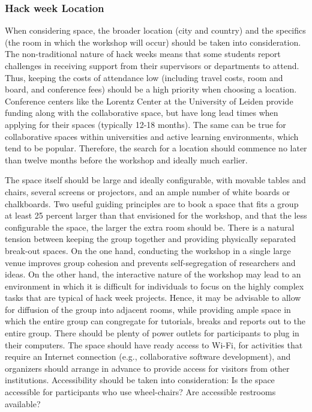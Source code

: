 \documentclass{aastex62}
\begin{document}
\subsubsection{Hack week Location}
When considering space, the broader location (city and country) and the specifics (the room in which the workshop will occur) should be taken into consideration. The non-traditional nature of hack weeks means that some students report challenges in receiving support from their supervisors or departments to attend. Thus, keeping the costs of attendance low (including travel costs, room and board, and conference fees) should be a high priority when choosing a location. Conference centers like the Lorentz Center at the University of Leiden provide funding along with the collaborative space, but have long lead times when applying for their spaces (typically 12-18 months). The same can be true for collaborative spaces within universities and active learning environments, which tend to be popular. Therefore, the search for a location should commence no later than twelve months before the workshop and ideally much earlier.

The space itself should be large and ideally configurable, with movable tables and chairs, several screens or projectors, and an ample number of white boards or chalkboards. Two useful guiding principles are to book a space that fits a group at least 25 percent larger than that envisioned for the workshop, and that the less configurable the space, the larger the extra room should be.
There is a natural tension between keeping the group together and providing physically separated break-out spaces. On the one hand, conducting the workshop in a single large venue improves group cohesion and prevents self-segregation of researchers and ideas. On the other hand, the interactive nature of the workshop may lead to an environment in which it is difficult for individuals to focus on the highly complex tasks that are typical of hack week projects. Hence, it may be advisable to allow for diffusion of the group into adjacent rooms, while providing ample space in which the entire group can congregate for tutorials, breaks and reports out to the entire group.
There should be plenty of power outlets for participants to plug in their computers.
The space should have ready access to Wi-Fi, for activities that require an Internet connection (e.g., collaborative software development), and organizers should arrange in advance to provide access for visitors from other institutions.
Accessibility should be taken into consideration: Is the space accessible for participants who use wheel-chairs? Are accessible restrooms available?
\end{document}
